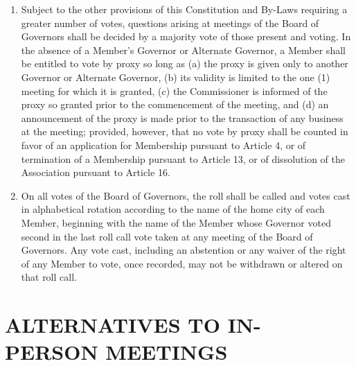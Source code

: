 \documentclass[]{book}
\providecommand{\tightlist}{%
  \setlength{\itemsep}{0pt}\setlength{\parskip}{0pt}}
\theoremstyle{definition}
\theoremstyle{definition}
\theoremstyle{definition}
\theoremstyle{remark}
\begin{document}
\begin{enumerate}
\def\labelenumi{(\alph{enumi})}
\tightlist
\item
  Subject to the other provisions of this Constitution and By-Laws
  requiring a greater number of votes, questions arising at meetings of
  the Board of Governors shall be decided by a majority vote of those
  present and voting. In the absence of a Member's Governor or Alternate
  Governor, a Member shall be entitled to vote by proxy so long as (a)
  the proxy is given only to another Governor or Alternate Governor, (b)
  its validity is limited to the one (1) meeting for which it is
  granted, (c) the Commissioner is informed of the proxy so granted
  prior to the commencement of the meeting, and (d) an announcement of
  the proxy is made prior to the transaction of any business at the
  meeting; provided, however, that no vote by proxy shall be counted in
  favor of an application for Membership pursuant to Article 4, or of
  termination of a Membership pursuant to Article 13, or of dissolution
  of the Association pursuant to Article 16.
\item
  On all votes of the Board of Governors, the roll shall be called and
  votes cast in alphabetical rotation according to the name of the home
  city of each Member, beginning with the name of the Member whose
  Governor voted second in the last roll call vote taken at any meeting
  of the Board of Governors. Any vote cast, including an abstention or
  any waiver of the right of any Member to vote, once recorded, may not
  be withdrawn or altered on that roll call.
\end{enumerate}

\section{ALTERNATIVES TO IN-PERSON
MEETINGS}\label{alternatives-to-in-person-meetings}
\end{document}
